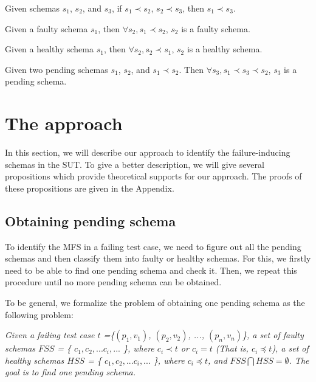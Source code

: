 \documentclass{sig-alternate-05-2015}
\begin{document}
\begin{proposition}\label{pro:subsumetrans}
Given schemas $s_{1}$, $s_{2}$, and $s_{3}$, if $s_{1} \prec s_{2}$, $s_{2} \prec s_{3}$, then $s_{1} \prec s_{3}$.
\end{proposition}
\begin{proposition}\label{pro:superoffaulty}
Given a faulty schema $s_{1}$, then $\forall s_{2}, s_{1} \prec s_{2}$, $s_{2}$ is a faulty schema.
\end{proposition}
\begin{proposition}\label{pro:subofhealthy}
Given a healthy schema $s_{1}$, then $\forall s_{2}, s_{2} \prec s_{1}$, $s_{2}$ is a healthy schema.
\end{proposition}
\begin{proposition}\label{pro:pending}
Given two pending schemas $s_{1}$, $s_{2}$, and $s_{1} \prec s_{2}$. Then $\forall s_{3}, s_{1} \prec s_{3} \prec s_{2}$, $s_{3}$ is a pending schema.
\end{proposition}

\section{The approach}\label{sec:app}
In this section, we will describe our approach to identify the failure-inducing schemas in the SUT. To give a better description, we will give several propositions which provide theoretical supports for our approach. The proofs of these propositions are given in the Appendix.


\subsection{Obtaining pending schema}

To identify the MFS in a failing test case, we need to figure out all the pending schemas and then classify them into faulty or healthy schemas. For this, we firstly need to be able to find one pending schema and check it. Then, we repeat this procedure until no more pending schema can be obtained.

To be general, we formalize the problem of obtaining one pending schema as the following problem:

\emph{Given a failing test case $t$ =\{$(p_{1}, v_{1})$, $(p_{2}, v_{2})$, ..., $(p_{n}, v_{n})$\}, a set of faulty schemas $FSS$ = \{ $c_{1}, c_{2}, ... c_{i}, ...$ \}, where  $c_{i} \prec t$ or $c_{i} = t$ (That is, $c_{i} \preceq t $), a set of healthy schemas $HSS$ = \{ $c_{1}, c_{2}, ... c_{i}, ...$ \}, where  $c_{i} \preceq t$, and $FSS \bigcap HSS = \emptyset$. The goal is to find one pending schema.}
\end{document}
